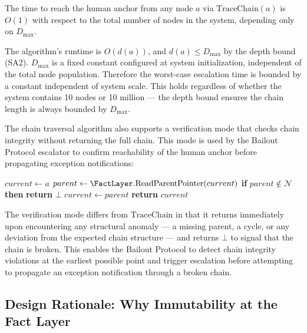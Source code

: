 \begin{prop}
\label{prop:rs-constant-time-escalation}
The time to reach the human anchor from any node $a$ via $\mathrm{TraceChain}(a)$ is $O(1)$ with respect to the total number of nodes in the system, depending only on $D_{\max}$.
\end{prop}

\begin{prf}
The algorithm's runtime is $O(d(a))$, and $d(a) \leq D_{\max}$ by the depth bound (SA2). $D_{\max}$ is a fixed constant configured at system initialization, independent of the total node population. Therefore the worst-case escalation time is bounded by a constant independent of system scale. This holds regardless of whether the system contains 10 nodes or 10 million --- the depth bound ensures the chain length is always bounded by $D_{\max}$.
\end{prf}

The chain traversal algorithm also supports a verification mode that checks chain integrity without returning the full chain. This mode is used by the Bailout Protocol escalator to confirm reachability of the human anchor before propagating exception notifications:

\begin{algorithmic}
\STATE $current \leftarrow a$
    \STATE $parent \leftarrow \FactLayer.\text{ReadParentPointer}(current)$
    \STATE \textbf{if} $parent \notin \mathcal{N}$ \textbf{then} \textbf{return} $\bot$ 
    \STATE $current \leftarrow parent$
\ENDWHILE
\STATE \textbf{return} $current$ 
\end{algorithmic}

The verification mode differs from $\mathrm{TraceChain}$ in that it returns immediately upon encountering any structural anomaly --- a missing parent, a cycle, or any deviation from the expected chain structure --- and returns $\bot$ to signal that the chain is broken. This enables the Bailout Protocol to detect chain integrity violations at the earliest possible point and trigger escalation before attempting to propagate an exception notification through a broken chain.

\subsection{Design Rationale: Why Immutability at the Fact Layer}
\label{sec:rs-immutability-rationale}

